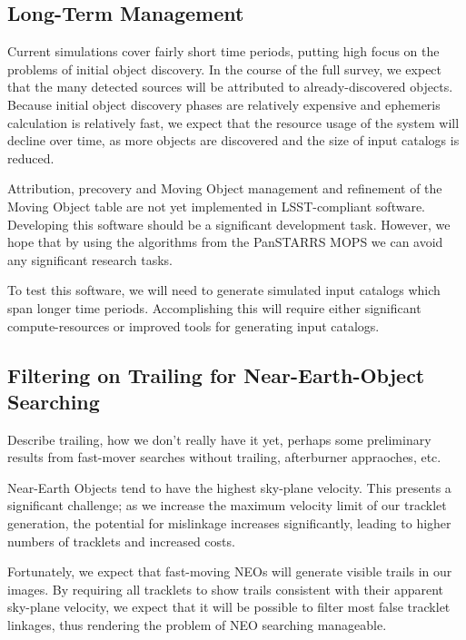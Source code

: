 \documentclass[12pt,preprint]{aastex}
\begin{document}
\subsection{Long-Term Management}

Current simulations cover fairly short time periods, putting high
focus on the problems of initial object discovery.  In the course of
the full survey, we expect that the many detected sources will be
attributed to already-discovered objects.  Because initial object
discovery phases are relatively expensive and ephemeris calculation is
relatively fast, we expect that the resource usage of the system will
decline over time, as more objects are discovered and the size of
input catalogs is reduced.

Attribution, precovery and Moving Object management and refinement of the
Moving Object table are not yet implemented in LSST-compliant software.
Developing this software should be a significant development task.
However, we hope that by using the algorithms from the PanSTARRS MOPS
we can avoid any significant research tasks.

To test this software, we will need to generate simulated input
catalogs which span longer time periods.  Accomplishing this will
require either significant compute-resources or improved tools for
generating input catalogs.



\subsection{Filtering on Trailing for Near-Earth-Object Searching}

\label{neosTrailing}

Describe trailing, how we don't really have it yet, perhaps some
preliminary results from fast-mover searches without trailing,
afterburner appraoches, etc.

Near-Earth Objects tend to have the highest sky-plane velocity.  This
presents a significant challenge; as we increase the maximum velocity
limit of our tracklet generation, the potential for mislinkage
increases significantly, leading to higher numbers of tracklets and
increased costs.  

Fortunately, we expect that fast-moving NEOs will generate visible
trails in our images.  By requiring all tracklets to show trails
consistent with their apparent sky-plane velocity, we expect that it
will be possible to filter most false tracklet linkages, thus
rendering the problem of NEO searching manageable.
\end{document}
